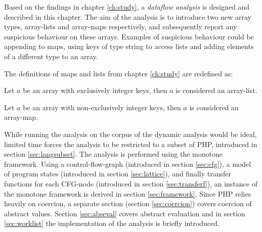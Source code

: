 Based on the findings in chapter \ref{ch:study}, a \emph{dataflow analysis} is designed and described in this chapter. The aim of the analysis is to introduce two new array types, array-lists and array-maps respectively, and subsequently report any suspicious behaviour on these arrays. Examples of suspicious behaviour could be appending to maps, using keys of type string to access lists and adding elements of a different type to an array.

The definitions of maps and lists from chapter \ref{ch:study} are redefined as:

\begin{definition}
Let $a$ be an array with exclusively integer keys, then $a$ is considered an array-list.
\label{def:newList}
\end{definition}

\begin{definition}
Let $a$ be an array with non-exclusively integer keys, then $a$ is considered an array-map.
\label{def:newMap}
\end{definition}

While running the analysis on the corpus of the dynamic analysis would be ideal, limited time forces the analysis to be restricted to a subset of PHP, introduced in section \ref{sec:langsubset}. The analysis is performed using the monotone framework. Using a control-flow-graph (introduced in section \ref{sec:cfg}), a model of program states (introduced in section \ref{sec:lattice}), and finally transfer functions for each CFG-node (introduced in section \ref{sec:transferf}), an instance of the monotone framework is derived in section \ref{sec:framework}. Since PHP relies heavily on coercion, a separate section (section \ref{sec:coercion}) covers coercion of abstract values. Section \ref{sec:abseval} covers abstract evaluation and in section \ref{sec:worklist} the implementation of the analysis is briefly introduced.
